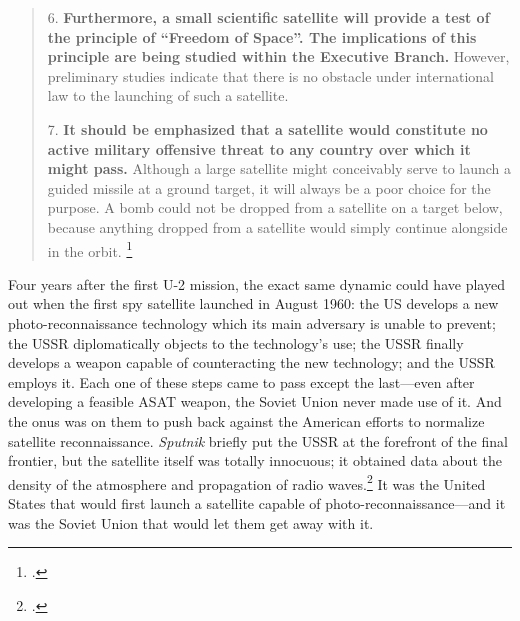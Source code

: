 \documentclass{report}
\begin{document}
\begin{quote}
6. \textelp{} \textbf{Furthermore, a small scientific satellite will provide a test of the principle of “Freedom of Space”. The implications of this principle are being studied within the Executive Branch.} However, preliminary studies indicate that there is no obstacle under international law to the launching of such a satellite.

7. \textbf{It should be emphasized that a satellite would constitute no active military offensive threat to any country over which it might pass.} Although a large satellite might conceivably serve to launch a guided missile at a ground target, it will always be a poor choice for the purpose. A bomb could not be dropped from a satellite on a target below, because anything dropped from a satellite would simply continue alongside in the orbit. \footcite{nsc_planning_board_draft_1955}
\end{quote}

Four years after the first U-2 mission, the exact same dynamic could have played out when the first spy satellite launched in August 1960: the US develops a new photo-reconnaissance technology which its main adversary is unable to prevent; the USSR diplomatically objects to the technology's use; the USSR finally develops a weapon capable of counteracting the new technology; and the USSR employs it. Each one of these steps came to pass except the last---even after developing a feasible ASAT weapon, the Soviet Union never made use of it. And the onus was on them to push back against the American efforts to normalize satellite reconnaissance. \emph{Sputnik} briefly put the USSR at the forefront of the final frontier, but the satellite itself was totally innocuous; it obtained data about the density of the atmosphere and propagation of radio waves.\footcite{nasa_sputnik_2019} It was the United States that would first launch a satellite capable of photo-reconnaissance---and it was the Soviet Union that would let them get away with it.
\end{document}
